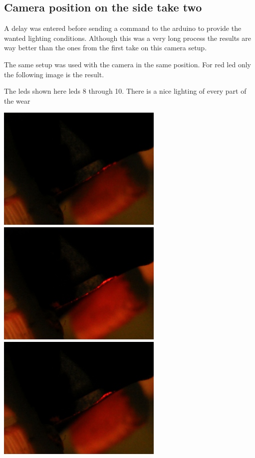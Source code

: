 \subsection{Camera position on the side take two}



A delay was entered before sending a command to the arduino to provide the wanted lighting conditions. Although this was a very long process the results are way better than the ones from the first take on this camera setup. 



The same setup was used with the camera in the same position. For red led only the following image is the result.



The leds shown here leds 8 through 10. There is a nice lighting of every part of the wear

\includegraphics[width=3.125000in, keepaspectratio=true]{./fig/Vision/Dataset/automated_datasets/1_check_camera_position/1_camera_position_side/p3_l8.png}\includegraphics[width=3.125000in, keepaspectratio=true]{./fig/Vision/Dataset/automated_datasets/1_check_camera_position/1_camera_position_side/p3_l9.png}\includegraphics[width=3.125000in, keepaspectratio=true]{./fig/Vision/Dataset/automated_datasets/1_check_camera_position/1_camera_position_side/p3_l10.png}



